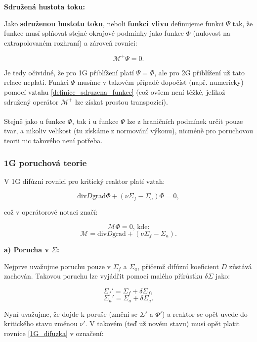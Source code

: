 \textbf{Sdružená hustota toku:}

Jako \textbf{sdruženou hustotu toku}, neboli \textbf{funkci vlivu} definujeme funkci $\Psi$ tak, že funkce musí splňovat stejné okrajové podmínky jako funkce $\Phi$ (nulovost na extrapolovaném rozhraní) a zároveň rovnici:

\begin{equation}
  \boxed{
  \mathcal{M}^+ \Psi = 0.
  \label{definice_sdruzena_funkce}}
\end{equation}

Je tedy očividné, že pro 1G přiblížení platí $\Psi = \Phi$, ale pro 2G přiblížení už tato relace neplatí. Funkci $\Psi$ musíme v takovém případě dopočíst (např. numericky) pomocí vztahu \eqref{definice_sdruzena_funkce} (což ovšem není těžké, jelikož sdružený operátor $\mathcal{M}^+$ lze získat prostou transpozicí).\\
\\
Stejně jako u funkce $\Phi$, tak i u funkce $\Psi$ lze z hraničních podmínek určit pouze tvar, a nikoliv velikost (tu získáme z normování výkonu), nicméně pro poruchovou teorii nic takového není potřeba.

\subsubsection{1G poruchová teorie}

V 1G difúzní rovnici pro kritický reaktor platí vztah:

\begin{equation}
  \text{div} D \text{grad} \Phi + (\nu \Sigma_f - \Sigma_a) \Phi = 0,
  \label{1G_difuzka}
\end{equation}

což v operátorové notaci značí:

$$ \mathcal{M} \Phi = 0 \text{, kde:} $$
$$ \mathcal{M} = \text{div} D \text{grad} + (\nu \Sigma_f - \Sigma_a). $$

\textbf{a) Porucha v $\Sigma$:}

Nejprve uvažujme poruchu pouze v $\Sigma_f$ a $\Sigma_a$, přičemž difúzní koeficient $D$ zůstává zachován. Takovou poruchu lze vyjádřit pomocí malého přírůstku $\delta \Sigma$ jako:

$$ \Sigma_f' = \Sigma_f + \delta \Sigma_f, $$
$$ \Sigma_a' = \Sigma_a + \delta \Sigma_a. $$

Nyní uvažujme, že dojde k poruše (změní se $\Sigma'$ a $\Phi'$) a reaktor se opět uvede do kritického stavu změnou $\nu'$. V takovém (teď už novém stavu) musí opět platit rovnice \eqref{1G_difuzka} v označení:

